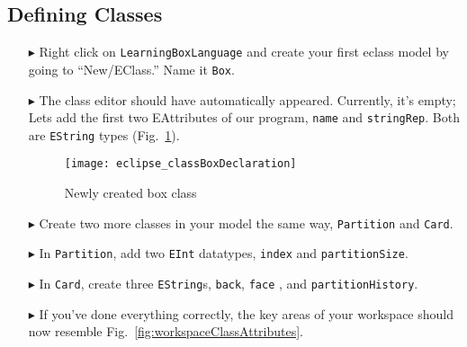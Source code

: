 \newpage
\subsection{Defining Classes}
\texHeader
\hypertarget{static:classes tex}{}

\begin{itemize}

\item[$\blacktriangleright$] Right click on \texttt{LearningBoxLanguage} and create your first eclass model by going to ``New/EClass.'' Name it \texttt{Box}.

\vspace{0.5cm}

\item[$\blacktriangleright$] The class editor should have automatically appeared. Currently, it's empty; Lets add the first two EAttributes of our program,
\texttt{name} and \texttt{stringRep}. Both are \texttt{EString} types (Fig.~\ref{fig:boxDeclaration}).

\vspace{0.5cm}

\begin{figure}[htbp]
	\centering
  \texttt{[image: eclipse\_classBoxDeclaration]}
	\caption{Newly created box class}
	\label{fig:boxDeclaration}
\end{figure} 

\item[$\blacktriangleright$] Create two more classes in your model the same way, \texttt{Partition} and \texttt{Card}.

\vspace{0.5cm}

\item[$\blacktriangleright$] In \texttt{Partition}, add two \texttt{EInt} datatypes, \texttt{index} and \texttt{partitionSize}.

\vspace{0.5cm}

\item[$\blacktriangleright$] In \texttt{Card}, create three \texttt{EString}s, \texttt{back}, \texttt{face} , and \texttt{partitionHistory}.

\vspace{0.5cm}

\item[$\blacktriangleright$] If you've done everything correctly, the key areas of your workspace should now resemble Fig.~\ref{fig:workspaceClassAttributes}.


\end{itemize}
